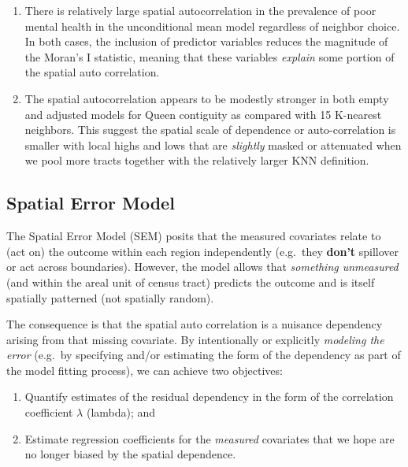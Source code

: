 \documentclass[
]{book}
\providecommand{\tightlist}{%
  \setlength{\itemsep}{0pt}\setlength{\parskip}{0pt}}
\begin{document}
\begin{enumerate}
\def\labelenumi{\arabic{enumi}.}
\tightlist
\item
  There is relatively large spatial autocorrelation in the prevalence of poor mental health in the unconditional mean model regardless of neighbor choice. In both cases, the inclusion of predictor variables reduces the magnitude of the Moran's I statistic, meaning that these variables \emph{explain} some portion of the spatial auto correlation.
\item
  The spatial autocorrelation appears to be modestly stronger in both empty and adjusted models for Queen contiguity as compared with 15 K-nearest neighbors. This suggest the spatial scale of dependence or auto-correlation is smaller with local highs and lows that are \emph{slightly} masked or attenuated when we pool more tracts together with the relatively larger KNN definition.
\end{enumerate}

\hypertarget{spatial-error-model-1}{%
\subsection{Spatial Error Model}\label{spatial-error-model-1}}

The Spatial Error Model (SEM) posits that the measured covariates relate to (act on) the outcome within each region independently (e.g.~they \textbf{don't} spillover or act across boundaries). However, the model allows that \emph{something unmeasured} (and within the areal unit of census tract) predicts the outcome and is itself spatially patterned (not spatially random).

The consequence is that the spatial auto correlation is a nuisance dependency arising from that missing covariate. By intentionally or explicitly \emph{modeling the error} (e.g.~by specifying and/or estimating the form of the dependency as part of the model fitting process), we can achieve two objectives:

\begin{enumerate}
\def\labelenumi{\arabic{enumi}.}
\tightlist
\item
  Quantify estimates of the residual dependency in the form of the correlation coefficient \(\lambda\) (lambda); and
\item
  Estimate regression coefficients for the \emph{measured} covariates that we hope are no longer biased by the spatial dependence.
\end{enumerate}
\end{document}
